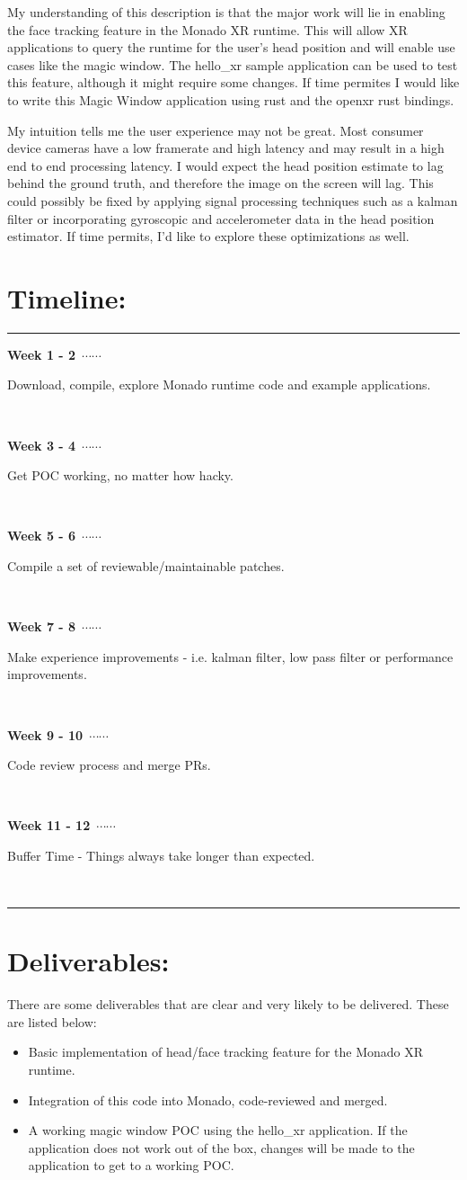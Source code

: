 \documentclass{article}
\newcommand\ytl[2]{
\parbox[b]{10em}{\hfill{\bfseries\sffamily
#1}~$\cdots\cdots$~}\makebox[0pt][c]{$\bullet$}\vrule\quad \parbox[c]{8cm}{\vspace{3pt}\raggedright\sffamily #2.\\[3pt]}\\[-3pt]}
\begin{document}
\begin{normalsize}
\begin{quote}
\end{quote}

My understanding of this description is that the major work will lie in enabling
the face tracking feature in the Monado XR runtime. This will allow XR
applications to query the runtime for the user's head position and will enable use
cases like the magic window. The hello\_xr sample application can be used to test
this feature, although it might require some changes. If time permites I would
like to write this Magic Window application using rust and the openxr rust
bindings.

My intuition tells me the user experience may not be great. Most consumer device
cameras have a low framerate and high latency and may result in a high end to end
processing latency. I would expect the head position estimate to lag behind the
ground truth, and therefore the image on the screen will lag. This could possibly
be fixed by applying signal processing techniques such as a kalman filter or
incorporating gyroscopic and accelerometer data in the head position estimator. If
time permits, I'd like to explore these optimizations as well.

\section{Timeline:}

\begin{table}[H]
\centering
\begin{minipage}[t]{.7\linewidth}
\rule{\linewidth}{1pt}
\ytl{Week 1 - 2}{Download, compile, explore Monado runtime code and example applications}
\ytl{Week 3 - 4}{Get POC working, no matter how hacky}
\ytl{Week 5 - 6}{Compile a set of reviewable/maintainable patches}
\ytl{Week 7 - 8}{Make experience improvements - i.e. kalman filter, low pass filter or performance improvements}
\ytl{Week 9 - 10}{Code review process and merge PRs}
\ytl{Week 11 - 12}{Buffer Time - Things always take longer than expected}
\bigskip
\rule{\linewidth}{1pt}%
\end{minipage}%
\end{table}

\section{Deliverables:}

There are some deliverables that are clear and very likely to be delivered. These
are listed below:

\begin{itemize}
\item Basic implementation of head/face tracking feature for the Monado XR runtime.
\item Integration of this code into Monado, code-reviewed and merged.
\item A working magic window POC using the hello\_xr application. If the
application does not work out of the box, changes will be made to the application
to get to a working POC.
\end{itemize}


\end{normalsize}
\end{document}
